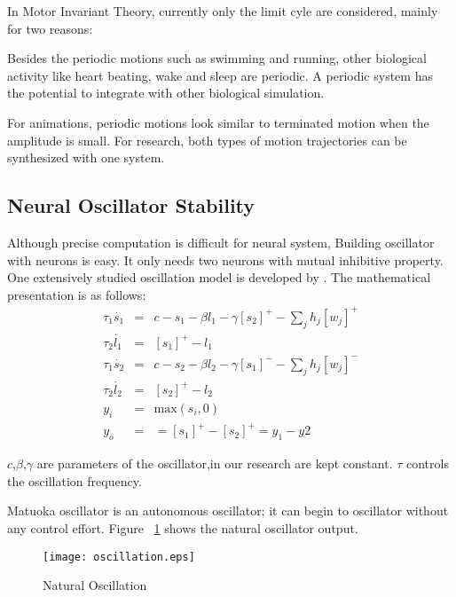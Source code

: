 In Motor Invariant Theory, currently only the limit cyle are considered, mainly for two reasons: 
\begin{itemize}
Besides the periodic motions such as swimming and running, other biological activity like heart beating, wake and sleep  are periodic.
A periodic system has the potential to integrate with other biological simulation.

For animations, periodic motions look similar to terminated motion when the amplitude is small. 
For \cms research, both types of motion trajectories can be synthesized with one system.
\end{itemize}

\subsection{Neural Oscillator Stability}
Although precise computation is difficult for neural system,  Building oscillator with neurons is easy. 
It only needs two neurons with mutual inhibitive property.
One extensively studied oscillation model is developed by \citet{neurooscillation}. 
The mathematical presentation is as follows:
\begin{eqnarray}
\tau_{1} \dot{s_{1}}&=&c-s_{1}-\beta l_{1}-\gamma [s_{2}]^{+}-\sum_{j}h_{j}[w_{j}]^{+}\\
\tau_{2} \dot{l_{1}}&=&[s_{1}]^{+}-l_{1}\\
\tau_{1} \dot{s_{2}}&=&c-s_{2}-\beta l_{2}-\gamma [s_{1}]^{-}-\sum_{j}h_{j}[w_{j}]^{-}\\
\tau_{2} \dot{l_{2}}&=&[s_{2}]^{+}-l_{2}\\
y_{i}&=&\mbox{max}(s_{i},0)\\
y_{o}&=&=[s_{1}]^{+}-[s_{2}]^{+}=y_{1}-y{2}
\label{eq:matsuta}
\end{eqnarray}

$c$,$\beta$,$\gamma$ are parameters of the oscillator,in our research are kept constant.
$\tau$ controls the oscillation frequency.







Matuoka oscillator is an autonomous oscillator; 
it can begin to oscillator without any control effort.
Figure ~\ref{fig:natural-oscilation} shows the natural oscillator output.
\begin{figure}[h]
\texttt{[image: oscillation.eps]}
\caption{Natural Oscillation}
\label{fig:natural-oscilation}
\end{figure}





